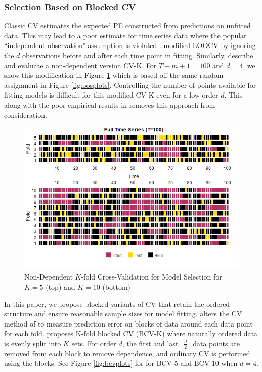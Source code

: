 \subsubsection{Selection Based on Blocked CV}
Classic CV estimates the expected PE constructed from predictions on unfitted data. This may lead to a poor estimate for time series data where the popular ``independent observation" assumption is violated \citep{Arlot2010}. \cite{Burman1994} modified LOOCV by ignoring the $d$ observations before and after each time point in fitting. Similarly, \cite{Bergmeir2018} describe and evaluate a non-dependent version CV-K. For $T-m+1=100$ and $d=4$, we show this modification in Figure \ref{fig:depkcvplots} which is based off the same random assignment in Figure \ref{fig:oosplots}. Controlling the number of points available for fitting models is difficult for this modified CV-K even for a low order $d$. This along with the poor empirical results in \cite{Bergmeir2018} removes this approach from consideration.

\begin{figure}[htbp!]
	\caption{Non-Dependent $K$-fold Cross-Validation for Model Selection for $K=5$ (top) and $K=10$ (bottom)}
	\center
	\label{fig:depkcvplots}
	\includegraphics[scale=0.58]{depkcvplots}
\end{figure}

In this paper, we propose blocked variants of CV that retain the ordered structure and ensure reasonable sample sizes for model fitting. \cite{Racine2000} alters the CV method of \cite{Burman1994} to measure prediction error on blocks of data around each data point for each fold. \cite{Bergmeir2012} proposes K-fold blocked CV (BCV-K) where naturally ordered data is evenly split into $K$ sets.  For order $d$, the first and last $\lceil \frac{d}{2} \rceil$ data points are removed from each block to remove dependence, and ordinary CV is performed using the blocks. See Figure \ref{fig:bcvplots} for for BCV-5 and BCV-10 when $d=4$. 

